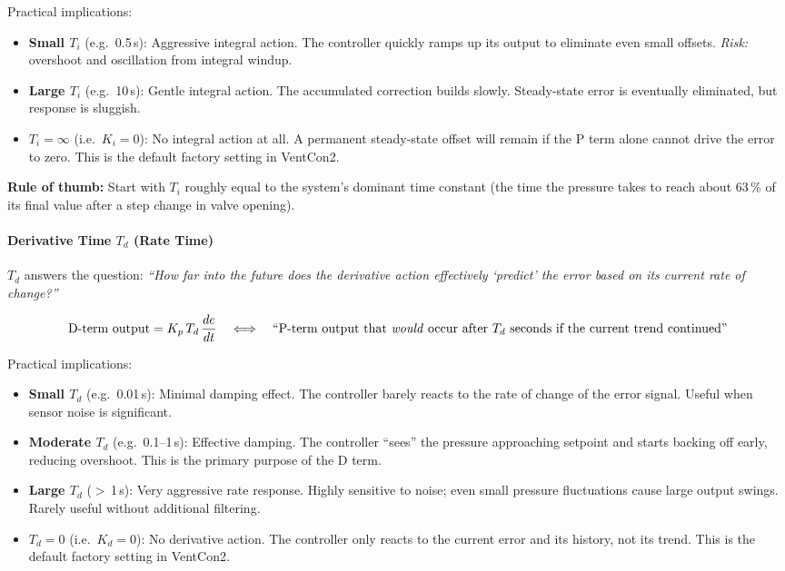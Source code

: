 \noindent
Practical implications:
\begin{itemize}
    \item \textbf{Small $T_i$} (e.g.\ 0.5\,s): Aggressive integral action. The controller quickly ramps up its output to eliminate even small offsets. \emph{Risk:} overshoot and oscillation from integral windup.
    \item \textbf{Large $T_i$} (e.g.\ 10\,s): Gentle integral action. The accumulated correction builds slowly. Steady-state error is eventually eliminated, but response is sluggish.
    \item \textbf{$T_i = \infty$} (i.e.\ $K_i = 0$): No integral action at all. A permanent steady-state offset will remain if the P term alone cannot drive the error to zero. This is the default factory setting in VentCon2.
\end{itemize}

\noindent
\textbf{Rule of thumb:} Start with $T_i$ roughly equal to the system's dominant time constant (the time the pressure takes to reach about 63\,\% of its final value after a step change in valve opening).

\paragraph{Derivative Time $T_d$ (Rate Time)}

$T_d$ answers the question: \emph{``How far into the future does the derivative action effectively `predict' the error based on its current rate of change?''}

\begin{equation}
    \text{D-term output} = K_p \, T_d \, \frac{de}{dt}
    \quad\Longleftrightarrow\quad
    \text{``P-term output that \emph{would} occur after } T_d \text{ seconds if the current trend continued''}
\end{equation}

\noindent
Practical implications:
\begin{itemize}
    \item \textbf{Small $T_d$} (e.g.\ 0.01\,s): Minimal damping effect. The controller barely reacts to the rate of change of the error signal. Useful when sensor noise is significant.
    \item \textbf{Moderate $T_d$} (e.g.\ 0.1--1\,s): Effective damping. The controller ``sees'' the pressure approaching setpoint and starts backing off early, reducing overshoot. This is the primary purpose of the D term.
    \item \textbf{Large $T_d$} ($>$\,1\,s): Very aggressive rate response. Highly sensitive to noise; even small pressure fluctuations cause large output swings. Rarely useful without additional filtering.
    \item \textbf{$T_d = 0$} (i.e.\ $K_d = 0$): No derivative action. The controller only reacts to the current error and its history, not its trend. This is the default factory setting in VentCon2.
\end{itemize}


